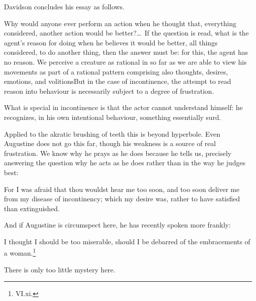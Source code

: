 \documentclass[11pt,letterpaper,oneside]{amsart}
\begin{document}







Davidson concludes his essay as follows.\begin{squote}Why would anyone ever perform an action when he thought that, everything considered, another action would be better?\ldots\  If the question is read, what is the agent's reason for doing  when he believes it would be better, all things considered, to do another thing, then the answer must be: for this, the agent has no reason. We perceive a creature as rational in so far as we are able to view his movements as part of a rational pattern comprising also thoughts, desires, emotions, and volitions\sdots But in the case of incontinence, the attempt to read reason into behaviour is necessarily subject to a degree of frustration.

What is special in incontinence is that the actor cannot understand himself: he recognizes, in his own intentional behaviour, something essentially surd.\end{squote} Applied to the akratic brushing of teeth this is beyond hyperbole. Even Augustine does not go this far, though his weakness is a source of real frustration. We know why he prays as he does because he tells us, precisely answering the question why he acts as he does rather than in the way he judges best:\begin{squote}For I was afraid that thou wouldst hear me too soon, and too soon deliver me from my disease of incontinency; which my desire was, rather to have satisfied than extinguished.\end{squote}And if Augustine is circumspect here, he has recently spoken more frankly:\begin{squote}I thought I should be too miserable, should I be debarred of the embracements of a woman.\footnote{VI.xi.}\end{squote} There is only too little mystery here. 
\end{document}
